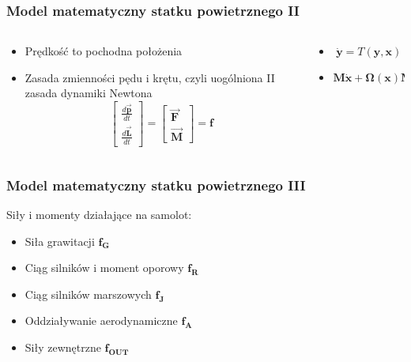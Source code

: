 \documentclass[aspectratio=169]{beamer}
\begin{document}
\begin{frame}%
	\frametitle{Model matematyczny statku powietrznego II}
	\begin{columns}[T]
		\begin{column}{0.5\textwidth}
			 \begin{itemize}
			  \item<2-> {
			    Prędkość to pochodna położenia
			    \vspace{15pt}
			  }
			  \item<4-> {   
			    Zasada zmienności pędu i krętu, czyli uogólniona II zasada dynamiki Newtona
			    \[
		              \begin{bmatrix}\frac{d\bm{\vec{p}}}{dt}\\ \frac{d\bm{\vec{L}}}{dt} \end{bmatrix} = \begin{bmatrix}\bm{\vec{F}}\\ \bm{\vec{M}} \end{bmatrix} = \bm{f}
		              \]
			    }
			\end{itemize}
		\end{column}
		\begin{column}{0.5\textwidth}
	   	 	\begin{itemize}
			  \item<3->[] {
			   \[
			   	\bm{\dot{y}} = T(\bm{y}, \bm{x})
			   \]
			  }
			  \vspace{15pt}
			  
			  \item<5->[]{   
			    \[
			   	\bm{M} \bm{\dot{x}} +  \bm{\Omega} \left( \bm{x} \right) \bm{M} \bm{x} = \bm{f}
			   \]
			    }
			\end{itemize}
		\end{column}
	\end{columns}
\end{frame}

\begin{frame}%
	\frametitle{Model matematyczny statku powietrznego III}
	Siły i momenty działające na samolot:
			 \begin{itemize}
			  \item<2-> {
			    Siła grawitacji  $\bm{f_G}$
			  }
			  \item<3-> {   
			    Ciąg silników i moment oporowy  $\bm{f_R}$
			   }
			    \item<3-> {   
			    Ciąg silników marszowych  $\bm{f_J}$
			   }
			    \item<4-> {   
			    Oddziaływanie aerodynamiczne $\bm{f_A}$
			   }
			    \item<5-> {   
			   Siły zewnętrzne $\bm{f_{OUT}}$
			   }
			\end{itemize}
\end{frame}
\end{document}
